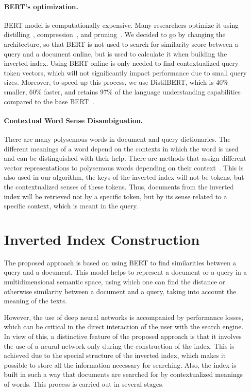 \documentclass[
    twocolumn,
]{template/ceurart}
\begin{document}
    \paragraph{BERT's optimization.}
    BERT model is computationally expensive.
    Many researchers optimize it using distilling~\cite{bertDistilling},
    compression~\cite{bertCompression}, and pruning~\cite{bertPruning}.
    We decided to go by changing the architecture, so that BERT is not used to search for
    similarity score between a query and a document online,
    but is used to calculate it when building the inverted index.
    Using BERT online is only needed to find contextualized query token vectors,
    which will not significantly impact performance due to small query sizes.
    Moreover, to speed up this process, we use DistilBERT, which is 40\% smaller, 60\% faster,
    and retains 97\% of the language understanding capabilities compared to the base BERT~\cite{bertDistilling}.

    \paragraph{Contextual Word Sense Disambiguation.}
    There are many polysemous words in document and query dictionaries.
    The different meanings of a word depend on the contexts in which the word is used and
    can be distinguished with their help.
    There are methods that assign different vector representations
    to polysemous words depending on their context~\cite{athiwaratkun2018probabilistic}.
    This is also used in our algorithm, the keys of the inverted index will not be tokens,
    but the contextualized senses of these tokens.
    Thus, documents from the inverted index will be retrieved not by a specific token,
    but by its sense related to a specific context, which is meant in the query.


    \section{Inverted Index Construction}
    The proposed approach is based on using BERT to find similarities between a query and a document.
    This model helps to represent a document or a query in a multidimensional semantic space,
    using which one can find the distance or otherwise similarity between a document and a query,
    taking into account the meaning of the texts.

    However, the use of deep neural networks is accompanied by performance losses,
    which can be critical in the direct interaction of the user with the search engine.
    In view of this, a distinctive feature of the proposed approach is that it involves the use of a neural network
    only during the construction of the index.
    This is achieved due to the special structure of the inverted index,
    which makes it possible to store all the information necessary for searching.
    Also, the index is built in such a way that documents are searched for by contextualized meanings of words.
    This process is carried out in several stages.
\end{document}
